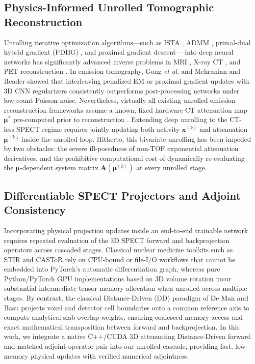 \documentclass[11pt, a4paper]{article}
\begin{document}
\subsection{Physics-Informed Unrolled Tomographic Reconstruction}
Unrolling iterative optimization algorithms---such as ISTA \cite{ref25}, ADMM \cite{ref26}, primal-dual hybrid gradient (PDHG) \cite{ref27}, and proximal gradient descent \cite{ref28}---into deep neural networks has significantly advanced inverse problems in MRI \cite{ref28}, X-ray CT \cite{ref27}, and PET reconstruction \cite{ref39, ref40}. In emission tomography, Gong \textit{et al.} \cite{ref39} and Mehranian and Reader \cite{ref40} showed that interleaving penalized EM or proximal gradient updates with 3D CNN regularizers consistently outperforms post-processing networks under low-count Poisson noise. Nevertheless, virtually all existing unrolled emission reconstruction frameworks assume a known, fixed hardware CT attenuation map $\boldsymbol{\mu}^*$ pre-computed prior to reconstruction \cite{ref39, ref40}. Extending deep unrolling to the CT-less SPECT regime requires jointly updating both activity $\mathbf{x}^{(k)}$ and attenuation $\boldsymbol{\mu}^{(k)}$ inside the unrolled loop. Hitherto, this bivariate unrolling has been impeded by two obstacles: the severe ill-posedness of non-TOF exponential attenuation derivatives, and the prohibitive computational cost of dynamically re-evaluating the $\boldsymbol{\mu}$-dependent system matrix $\mathbf{A}(\boldsymbol{\mu}^{(k)})$ at every unrolled stage.

\subsection{Differentiable SPECT Projectors and Adjoint Consistency}
Incorporating physical projection updates inside an end-to-end trainable network requires repeated evaluation of the 3D SPECT forward and backprojection operators across cascaded stages. Classical nuclear medicine toolkits such as STIR \cite{ref34} and CASToR \cite{ref35} rely on CPU-bound or file-I/O workflows that cannot be embedded into PyTorch's automatic differentiation graph, whereas pure Python/PyTorch GPU implementations \cite{ref33} based on 3D volume rotation incur substantial intermediate tensor memory allocation when unrolled across multiple stages. By contrast, the classical Distance-Driven (DD) paradigm of De Man and Basu \cite{ref36, ref37} projects voxel and detector cell boundaries onto a common reference axis to compute analytical slab-overlap weights, ensuring coalesced memory access and exact mathematical transposition between forward and backprojection. In this work, we integrate a native C++/CUDA 3D attenuating Distance-Driven forward and matched adjoint operator pair into our unrolled cascade, providing fast, low-memory physical updates with verified numerical adjointness.
\end{document}
